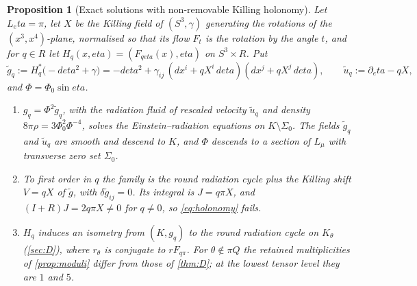 \documentclass[11pt]{article}
\theoremstyle{canonmath}
\theoremstyle{canonpostulate}
\theoremstyle{canonproposition}
\theoremstyle{canonmath}
\newtheorem{proposition*}[theorem]{Proposition}
\theoremstyle{canonproposition}
\providecommand{\Lmu}{\mathcal{L}_\mu}
\providecommand{\Klein}{\mathcal{K}}
\providecommand{\R}{\mathbb{R}}
\def\mathbb#1{#1}%
\def\mathcal#1{#1}%
\def\eta{eta}%
\begin{document}
\begin{proposition*}[Exact solutions with non-removable Killing holonomy]\label{prop:holonomy}
Let $L_\eta=\pi$, let $X$ be the Killing field of $(S^3,\gamma)$ generating the rotations of the $(x^3,x^4)$-plane, normalised so that its flow $F_t$ is the rotation by the angle $t$, and for $q\in\R$ let $H_q(x,\eta) = (F_{q\eta}(x),\eta)$ on $S^3\times\R$. Put
\[
\tilde g_q := H_q^*\bigl(-d\eta^2+\gamma\bigr) = -d\eta^2 + \gamma_{ij}\,(dx^i+qX^i\,d\eta)(dx^j+qX^j\,d\eta), \qquad \tilde u_q := \partial_\eta - qX,
\]
and $\Phi = \Phi_0\sin\eta$.
\begin{enumerate}[label=(\alph*)]
\item $g_q = \Phi^2\tilde g_q$, with the radiation fluid of rescaled velocity $\tilde u_q$ and density $8\pi\rho = 3\Phi_0^2\Phi^{-4}$, solves the Einstein--radiation equations on $\Klein\setminus\Sigma_0$. The fields $\tilde g_q$ and $\tilde u_q$ are smooth and descend to $\Klein$, and $\Phi$ descends to a section of $\Lmu$ with transverse zero set $\Sigma_0$.
\item To first order in $q$ the family is the round radiation cycle plus the Killing shift $V = qX$ of $\tilde g$, with $\delta\tilde g_{ij} = 0$. Its integral is $J = q\pi X$, and $(I+R)J = 2q\pi X\neq0$ for $q\neq0$, so \eqref{eq:holonomy} fails.
\item $H_q$ induces an isometry from $(\Klein,g_q)$ to the round radiation cycle on $\Klein_\theta$ (\cref{sec:D}), where $r_\theta$ is conjugate to $rF_{q\pi}$. For $\theta\notin\pi\mathbb Q$ the retained multiplicities of \cref{prop:moduli} differ from those of \cref{thm:D}; at the lowest tensor level they are $1$ and $5$.
\end{enumerate}
\end{proposition*}
\end{document}
